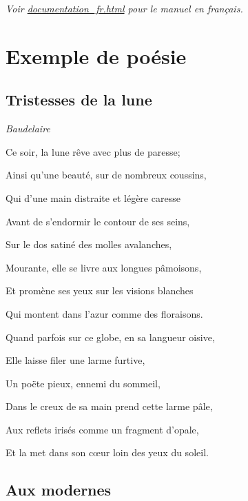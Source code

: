 \documentclass[openany]{book} %
\begin{document}
\textit{Voir \href{docs/documentation\_fr.html}{documentation\_fr.html} pour le manuel en français.}

\hypertarget{toc9}{}
\pagebreak[\PAGExBREAKxPOLICY]
\chapter{Exemple de poésie}

\hypertarget{toc10}{}
\pagebreak[\PAGExSUBxBREAKxPOLICY]
\section{Tristesses de la lune}

\textit{Baudelaire}

\begin{center}
              \lunep
\par\noindent Ce soir, la lune rêve avec plus de paresse;
\par\noindent Ainsi qu'une beauté, sur de nombreux coussins,
\par\noindent Qui d'une main distraite et légère caresse
\par\noindent Avant de s'endormir le contour de ses seins,
              \lunefull        
\par\noindent Sur le dos satiné des molles avalanches,
\par\noindent Mourante, elle se livre aux longues pâmoisons,
\par\noindent Et promène ses yeux sur les visions blanches
\par\noindent Qui montent dans l'azur comme des floraisons.
              \luned
\par\noindent Quand parfois sur ce globe, en sa langueur oisive,
\par\noindent Elle laisse filer une larme furtive,
\par\noindent Un poëte pieux, ennemi du sommeil,
              \soleil
\par\noindent Dans le creux de sa main prend cette larme pâle,
\par\noindent Aux reflets irisés comme un fragment d'opale,
\par\noindent Et la met dans son cœur loin des yeux du soleil.
              \luned
\end{center}

\hypertarget{toc11}{}
\pagebreak[\PAGExSUBxBREAKxPOLICY]
\section{Aux modernes}
\end{document}
